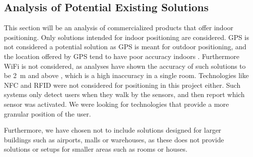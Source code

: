 \subsection{Analysis of Potential Existing Solutions}
This section will be an analysis of commercialized products that offer indoor positioning.
Only solutions intended for indoor positioning are considered.
GPS is not considered a potential solution as GPS is meant for outdoor positioning, 
and the location offered by GPS tend to have poor accuracy indoors \cite{Liu:4343996}.
Furthermore WiFi is not considered, 
as analyses have shown the accuracy of such solutions to be \SI{2}{\meter} and above \cite{Liu:4343996,jekabsons2011analysis}, 
which is a high inaccuracy in a single room. 
Technologies like NFC and RFID were not considered for positioning in this project either. 
Such systems only detect users when they walk by the sensors, 
and then report which sensor was activated.
We were looking for technologies that provide a more granular position of the user. 

Furthermore, we have chosen not to include solutions designed for larger buildings such as airports, malls or warehouses, 
as these does not provide solutions or setups for smaller areas such as rooms or houses. 

